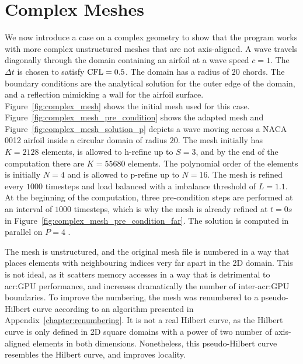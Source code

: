 \section{Complex Meshes}\label{section:results:complex_meshes}

We now introduce a case on a complex geometry to show that the program works with more complex
unstructured meshes that are not axis-aligned. A wave travels diagonally through the domain
containing an airfoil at a wave speed \(c = 1\). The \(\Delta t\) is chosen to satisfy \(\operatorname{CFL} =
0.5\). The domain has a radius of \(20\) chords. The boundary conditions are the analytical solution
for the outer edge of the domain, and a reflection mimicking a wall for the airfoil surface.
Figure~\ref{fig:complex_mesh} shows the initial mesh used for this case.
Figure~\ref{fig:complex_mesh_pre_condition} shows the adapted mesh and
Figure~\ref{fig:complex_mesh_solution_p} depicts a wave moving across a NACA 0012 airfoil inside a
circular domain of radius \(20\). The mesh initially has \(K = 2128\) elements, is allowed to
h-refine up to \(S = 3\), and by the end of the computation there are \(K = 55680\) elements. The
polynomial order of the elements is initially \(N = 4\) and is allowed to p-refine up to \(N = 16\).
The mesh is refined every \(1000\) timesteps and load balanced with a imbalance threshold of \(L =
1.1\). At the beginning of the computation, three pre-condition steps are performed at an interval
of \(1000\) timesteps, which is why the mesh is already refined at \(t = 0 s\) in
Figure~\ref{fig:complex_mesh_pre_condition_far}. The solution is computed in parallel on \(P = 4\)
.

The mesh is unstructured, and the original mesh file is numbered in a way that places elements with
neighbouring indices very far apart in the 2D domain. This is not ideal, as it scatters memory
accesses in a way that is detrimental to \acrshort{acr:GPU} performance, and increases dramatically
the number of inter-\acrshort{acr:GPU} boundaries. To improve the numbering, the mesh was renumbered
to a pseudo-Hilbert curve according to an algorithm presented in Appendix~\ref{chapter:renumbering}.
It is not a real Hilbert curve, as the Hilbert curve is only defined in 2D square domains with a
power of two number of axis-aligned elements in both dimensions. Nonetheless, this pseudo-Hilbert
curve resembles the Hilbert curve, and improves locality.

